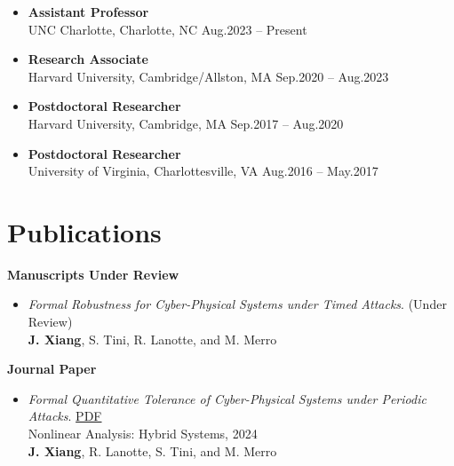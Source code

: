 \documentclass[11pt]{article}
\begin{document}
\begin{itemize}
  \item \textbf{Assistant Professor} \\
UNC Charlotte, Charlotte, NC \hfill Aug.2023 – Present
    \item \textbf{Research Associate} \\
Harvard University, Cambridge/Allston, MA \hfill Sep.2020 – Aug.2023
    \item \textbf{Postdoctoral Researcher} \\
Harvard University, Cambridge, MA \hfill Sep.2017 – Aug.2020
    \item \textbf{Postdoctoral Researcher}	\\
University of Virginia, Charlottesville, VA \hfill  Aug.2016 – May.2017
\end{itemize}





\section{Publications}


\textbf{Manuscripts Under Review}

\begin{itemize}
\item \textit{Formal Robustness for Cyber-Physical Systems under Timed
Attacks}. (Under Review) \\
\textbf{J. Xiang}, S. Tini, R. Lanotte, and M. Merro
%

\end{itemize}

\textbf{Journal Paper}

\begin{itemize}
  \item \textit{Formal Quantitative Tolerance of Cyber-Physical Systems under Periodic Attacks}.
  \href{https://arxiv.org/pdf/2403.05829}{PDF} \\
  Nonlinear Analysis: Hybrid Systems, 2024 \\
  \textbf{J. Xiang}, R. Lanotte, S. Tini, and M. Merro
  


\end{itemize}
\end{document}
